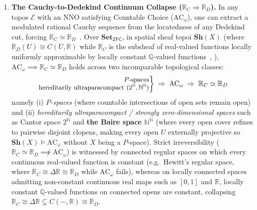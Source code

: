 \begin{enumerate}

  \item \textbf{The Cauchy-to-Dedekind Continuum Collapse ($\mathbb{R}_C \Rightarrow \mathbb{R}_D$).} In any topos $\mathcal{E}$ with an $\mathrm{NNO}$ satisfying Countable Choice ($\mathrm{AC}_\omega$), one can extract a modulated rational Cauchy sequence from the locatedness of any Dedekind cut, forcing $\mathbb{R}_C \simeq \mathbb{R}_D$~\cite[\S D4.7, Thms.~D4.7.10--D4.7.12]{Johnstone02}. Over $\mathbf{Set}_{\mathsf{ZFC}}$, in spatial sheaf topoi $\mathbf{Sh}(X)$ (where $\mathbb{R}_D(U) \cong C(U, \mathbb{R})$ while $\mathbb{R}_C$ is the subsheaf of real-valued functions locally uniformly approximable by locally constant $\mathbb{Q}$-valued functions~\cite[\S\S 2--3]{FourmanHyland79}, \cite[D4.7.10--D4.7.12]{Johnstone02}), $\mathrm{AC}_\omega \implies \mathbb{R}_C \simeq \mathbb{R}_D$ holds across two incomparable topological classes:
\[
  {\small\left.\begin{array}{@{}r@{}}
    \text{$P$-spaces} \\
    \text{hereditarily ultraparacompact } (2^{\mathbb{N}}, \mathbb{N}^{\mathbb{N}})
  \end{array}\right\}
  \;\Rightarrow\; \mathrm{AC}_\omega \;\Rightarrow\; \mathbb{R}_C \simeq \mathbb{R}_D}
\]
namely (i) \emph{$P$-spaces} (where countable intersections of open sets remain open) and (ii) \emph{hereditarily ultraparacompact / strongly zero-dimensional spaces} such as Cantor space $2^{\mathbb{N}}$ and \textbf{the Baire space $\mathbb{N}^{\mathbb{N}}$} (where every open cover refines to pairwise disjoint clopens, making every open $U$ externally projective so $\mathbf{Sh}(X) \models \mathrm{AC}_\omega$ without $X$ being a $P$-space). Strict irreversibility ($\mathbb{R}_C \simeq \mathbb{R}_D \not\implies \mathrm{AC}_\omega$) is witnessed by connected regular spaces on which every continuous real-valued function is constant (e.g.\ Hewitt's regular space, where $\mathbb{R}_C \cong \Delta\mathbb{R} \cong \mathbb{R}_D$ while $\mathrm{AC}_\omega$ fails), whereas on locally connected spaces admitting non-constant continuous real maps such as $[0, 1]$ and $\mathbb{R}$, locally constant $\mathbb{Q}$-valued functions on connected opens are constant, collapsing $\mathbb{R}_C \cong \Delta\mathbb{R} \subsetneq C(-, \mathbb{R}) \cong \mathbb{R}_D$.


\end{enumerate}
